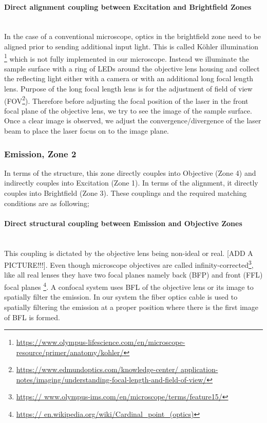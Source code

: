 \paragraph{Direct alignment coupling between Excitation and Brightfield Zones}\mbox{}\\
In the case of a conventional microscope, optics in the brightfield zone need to be aligned
prior to sending additional input light. This is called K\"{o}hler illumination
\footnote{\url{https://www.olympus-lifescience.com/en/microscope-resource/primer/anatomy/kohler/}}
which is not fully implemented in our microscope. Instead we illuminate the sample surface with
a ring of LEDs around the objective lens housing and collect the reflecting light either with
a camera or with an additional long focal length lens. Purpose of the long focal length lens is 
for the adjustment of field of view (FOV\footnote{\url{https://www.edmundoptics.com/knowledge-center/
		application-notes/imaging/understanding-focal-length-and-field-of-view/}}). Therefore
before adjusting the focal position of the laser in the front focal plane of the objective lens,
we try to see the image of the sample surface. Once a clear image is observed, we adjust the 
convergence/divergence of the laser beam to place the laser focus on to the image plane.

\subsubsection{Emission, Zone 2}\label{subsubsec:emissionCouplings}
In terms of the structure, this zone directly couples into Objective (Zone 4) and indirectly couples 
into Excitation (Zone 1). In terms of the alignment, it directly couples into Brightfield (Zone 3).
These couplings and the required matching conditions are as following;

\paragraph{Direct structural coupling between Emission and Objective Zones}\mbox{}\\
This coupling is dictated by the objective lens being non-ideal or real. [ADD A PICTURE!!!].
Even though microscope objectives are called infinity-corrected\footnote{\url{https://
		www.olympus-ims.com/en/microscope/terms/feature15/}}, like all real lenses they have 
two focal planes namely back (BFP) and front (FFL) focal planes \footnote{\url{https://
		en.wikipedia.org/wiki/Cardinal_point_(optics)}}. A confocal system uses BFL of the 
objective lens or its image to spatially filter the emission. In our system the fiber optics 
cable is used to spatially filtering the emission at a proper position where there is the first
image of BFL is formed.

